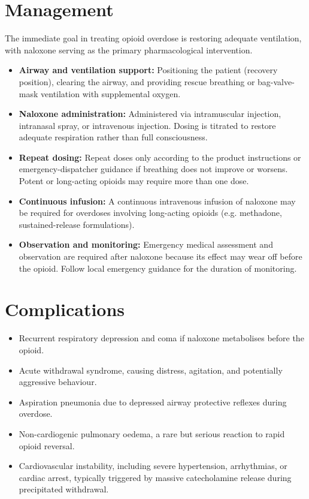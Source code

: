 \section*{Management}
The immediate goal in treating opioid overdose is restoring adequate ventilation, with naloxone serving as the primary pharmacological intervention.
\begin{itemize}
    \item \textbf{Airway and ventilation support:} Positioning the patient (recovery position), clearing the airway, and providing rescue breathing or bag-valve-mask ventilation with supplemental oxygen.
    \item \textbf{Naloxone administration:} Administered via intramuscular injection, intranasal spray, or intravenous injection. Dosing is titrated to restore adequate respiration rather than full consciousness.
    \item \textbf{Repeat dosing:} Repeat doses only according to the product instructions or emergency-dispatcher guidance if breathing does not improve or worsens. Potent or long-acting opioids may require more than one dose.
    \item \textbf{Continuous infusion:} A continuous intravenous infusion of naloxone may be required for overdoses involving long-acting opioids (e.g. methadone, sustained-release formulations).
    \item \textbf{Observation and monitoring:} Emergency medical assessment and observation are required after naloxone because its effect may wear off before the opioid. Follow local emergency guidance for the duration of monitoring.
\end{itemize}

\section*{Complications}
\begin{itemize}
    \item Recurrent respiratory depression and coma if naloxone metabolises before the opioid.
    \item Acute withdrawal syndrome, causing distress, agitation, and potentially aggressive behaviour.
    \item Aspiration pneumonia due to depressed airway protective reflexes during overdose.
    \item Non-cardiogenic pulmonary oedema, a rare but serious reaction to rapid opioid reversal.
    \item Cardiovascular instability, including severe hypertension, arrhythmias, or cardiac arrest, typically triggered by massive catecholamine release during precipitated withdrawal.
\end{itemize}

